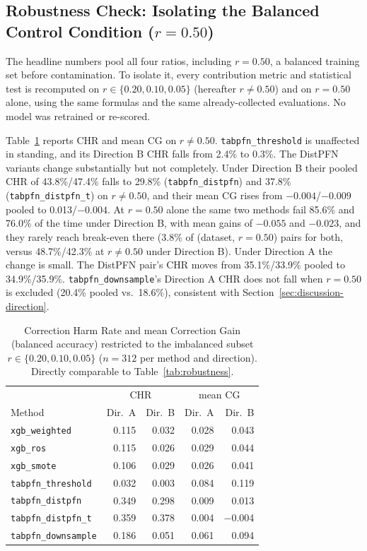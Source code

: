\subsection{Robustness Check: Isolating the Balanced Control Condition ($r{=}0.50$)}
\label{sec:results-r050}

The headline numbers pool all four ratios, including $r{=}0.50$, a balanced
training set before contamination. To isolate it, every contribution metric and
statistical test is recomputed on $r \in \{0.20, 0.10, 0.05\}$ (hereafter
$r{\neq}0.50$) and on $r{=}0.50$ alone, using the same formulas and the same
already-collected evaluations. No model was retrained or re-scored.

Table~\ref{tab:robustness-r050} reports CHR and mean CG on $r{\neq}0.50$.
\texttt{tabpfn\_threshold} is unaffected in standing, and its Direction B CHR
falls from 2.4\% to 0.3\%. The DistPFN variants change substantially but not
completely. Under Direction B their pooled CHR of 43.8\%/47.4\% falls to 29.8\%
(\texttt{tabpfn\_distpfn}) and 37.8\% (\texttt{tabpfn\_distpfn\_t}) on
$r{\neq}0.50$, and their mean CG rises from $-0.004$/$-0.009$ pooled to
0.013/$-0.004$. At $r{=}0.50$ alone the same two methods fail 85.6\% and 76.0\% of
the time under Direction B, with mean gains of $-0.055$ and $-0.023$, and they
rarely reach break-even there (3.8\% of (dataset, $r{=}0.50$) pairs for both,
versus 48.7\%/42.3\% at $r{\neq}0.50$ under Direction B). Under Direction A the change is small. The
DistPFN pair's CHR moves from 35.1\%/33.9\% pooled to 34.9\%/35.9\%.
\texttt{tabpfn\_downsample}'s Direction A CHR does not fall when $r{=}0.50$ is
excluded (20.4\% pooled vs.\ 18.6\%), consistent with
Section~\ref{sec:discussion-direction}.

\begin{table}[t]
\centering
\caption{Correction Harm Rate and mean Correction Gain (balanced accuracy)
restricted to the imbalanced subset $r \in \{0.20, 0.10, 0.05\}$ ($n{=}312$ per
method and direction). Directly comparable to Table~\ref{tab:robustness}.}
\label{tab:robustness-r050}
\begin{tabular}{@{}lrrrr@{}}
\toprule
& \multicolumn{2}{c}{CHR} & \multicolumn{2}{c}{mean CG} \\
Method & Dir.\ A & Dir.\ B & Dir.\ A & Dir.\ B \\
\midrule
\texttt{xgb\_weighted}      & 0.115 & 0.032 & 0.028 & 0.043 \\
\texttt{xgb\_ros}           & 0.115 & 0.026 & 0.029 & 0.044 \\
\texttt{xgb\_smote}         & 0.106 & 0.029 & 0.026 & 0.041 \\
\texttt{tabpfn\_threshold}  & 0.032 & 0.003 & 0.084 & 0.119 \\
\texttt{tabpfn\_distpfn}    & 0.349 & 0.298 & 0.009 & 0.013 \\
\texttt{tabpfn\_distpfn\_t} & 0.359 & 0.378 & 0.004 & $-$0.004 \\
\texttt{tabpfn\_downsample} & 0.186 & 0.051 & 0.061 & 0.094 \\
\bottomrule
\end{tabular}
\end{table}

